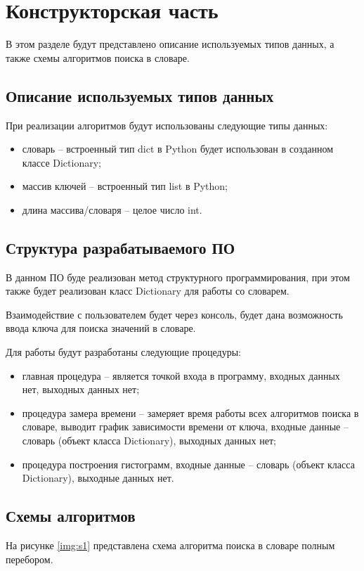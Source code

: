 \chapter{Конструкторская часть}
В этом разделе будут представлено описание используемых типов данных,
а также схемы алгоритмов поиска в словаре.

\section{Описание используемых типов данных}
При реализации алгоритмов будут использованы следующие типы данных:
\begin{itemize}
	\item словарь -- встроенный тип dict \cite{pythondict} в Python\cite{pythonlang} будет использован в созданном классе Dictionary;
	\item массив ключей -- встроенный тип list \cite{pythonlist} в Python\cite{pythonlang};
	\item длина массива/словаря -- целое число int.
\end{itemize}

\section{Структура разрабатываемого ПО}
В данном ПО буде реализован метод структурного программирования, при этом также будет реализован класс Dictionary для работы со словарем.

Взаимодействие с пользователем будет через консоль, будет дана возможность ввода ключа для поиска значений в словаре.

Для работы будут разработаны следующие процедуры:
\begin{itemize}
	\item главная процедура -- является точкой входа в программу, входных данных нет, выходных данных нет;
	\item процедура замера времени -- замеряет время работы всех алгоритмов поиска в словаре, выводит график зависимости времени от ключа, входные данные -- словарь (объект класса Dictionary), выходных данных нет;
	\item процедура построения гистограмм, входные данные -- словарь (объект класса Dictionary), выходные данных нет.
\end{itemize}

\section{Схемы алгоритмов}
На рисунке \ref{img:s1} представлена схема алгоритма поиска в словаре полным перебором.

